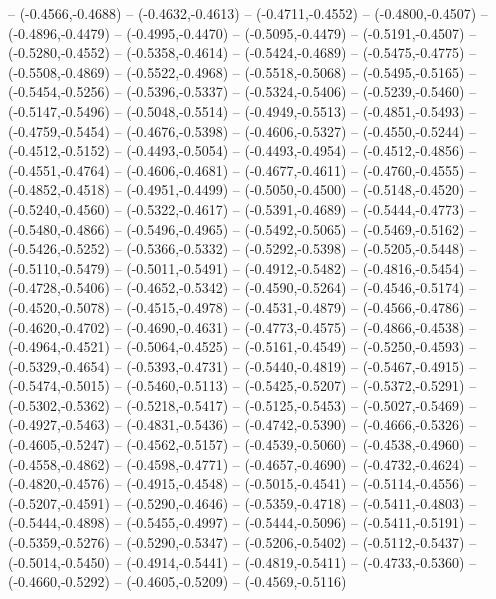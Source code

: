 {	-- (-0.4566,-0.4688)
	-- (-0.4632,-0.4613)
	-- (-0.4711,-0.4552)
	-- (-0.4800,-0.4507)
	-- (-0.4896,-0.4479)
	-- (-0.4995,-0.4470)
	-- (-0.5095,-0.4479)
	-- (-0.5191,-0.4507)
	-- (-0.5280,-0.4552)
	-- (-0.5358,-0.4614)
	-- (-0.5424,-0.4689)
	-- (-0.5475,-0.4775)
	-- (-0.5508,-0.4869)
	-- (-0.5522,-0.4968)
	-- (-0.5518,-0.5068)
	-- (-0.5495,-0.5165)
	-- (-0.5454,-0.5256)
	-- (-0.5396,-0.5337)
	-- (-0.5324,-0.5406)
	-- (-0.5239,-0.5460)
	-- (-0.5147,-0.5496)
	-- (-0.5048,-0.5514)
	-- (-0.4949,-0.5513)
	-- (-0.4851,-0.5493)
	-- (-0.4759,-0.5454)
	-- (-0.4676,-0.5398)
	-- (-0.4606,-0.5327)
	-- (-0.4550,-0.5244)
	-- (-0.4512,-0.5152)
	-- (-0.4493,-0.5054)
	-- (-0.4493,-0.4954)
	-- (-0.4512,-0.4856)
	-- (-0.4551,-0.4764)
	-- (-0.4606,-0.4681)
	-- (-0.4677,-0.4611)
	-- (-0.4760,-0.4555)
	-- (-0.4852,-0.4518)
	-- (-0.4951,-0.4499)
	-- (-0.5050,-0.4500)
	-- (-0.5148,-0.4520)
	-- (-0.5240,-0.4560)
	-- (-0.5322,-0.4617)
	-- (-0.5391,-0.4689)
	-- (-0.5444,-0.4773)
	-- (-0.5480,-0.4866)
	-- (-0.5496,-0.4965)
	-- (-0.5492,-0.5065)
	-- (-0.5469,-0.5162)
	-- (-0.5426,-0.5252)
	-- (-0.5366,-0.5332)
	-- (-0.5292,-0.5398)
	-- (-0.5205,-0.5448)
	-- (-0.5110,-0.5479)
	-- (-0.5011,-0.5491)
	-- (-0.4912,-0.5482)
	-- (-0.4816,-0.5454)
	-- (-0.4728,-0.5406)
	-- (-0.4652,-0.5342)
	-- (-0.4590,-0.5264)
	-- (-0.4546,-0.5174)
	-- (-0.4520,-0.5078)
	-- (-0.4515,-0.4978)
	-- (-0.4531,-0.4879)
	-- (-0.4566,-0.4786)
	-- (-0.4620,-0.4702)
	-- (-0.4690,-0.4631)
	-- (-0.4773,-0.4575)
	-- (-0.4866,-0.4538)
	-- (-0.4964,-0.4521)
	-- (-0.5064,-0.4525)
	-- (-0.5161,-0.4549)
	-- (-0.5250,-0.4593)
	-- (-0.5329,-0.4654)
	-- (-0.5393,-0.4731)
	-- (-0.5440,-0.4819)
	-- (-0.5467,-0.4915)
	-- (-0.5474,-0.5015)
	-- (-0.5460,-0.5113)
	-- (-0.5425,-0.5207)
	-- (-0.5372,-0.5291)
	-- (-0.5302,-0.5362)
	-- (-0.5218,-0.5417)
	-- (-0.5125,-0.5453)
	-- (-0.5027,-0.5469)
	-- (-0.4927,-0.5463)
	-- (-0.4831,-0.5436)
	-- (-0.4742,-0.5390)
	-- (-0.4666,-0.5326)
	-- (-0.4605,-0.5247)
	-- (-0.4562,-0.5157)
	-- (-0.4539,-0.5060)
	-- (-0.4538,-0.4960)
	-- (-0.4558,-0.4862)
	-- (-0.4598,-0.4771)
	-- (-0.4657,-0.4690)
	-- (-0.4732,-0.4624)
	-- (-0.4820,-0.4576)
	-- (-0.4915,-0.4548)
	-- (-0.5015,-0.4541)
	-- (-0.5114,-0.4556)
	-- (-0.5207,-0.4591)
	-- (-0.5290,-0.4646)
	-- (-0.5359,-0.4718)
	-- (-0.5411,-0.4803)
	-- (-0.5444,-0.4898)
	-- (-0.5455,-0.4997)
	-- (-0.5444,-0.5096)
	-- (-0.5411,-0.5191)
	-- (-0.5359,-0.5276)
	-- (-0.5290,-0.5347)
	-- (-0.5206,-0.5402)
	-- (-0.5112,-0.5437)
	-- (-0.5014,-0.5450)
	-- (-0.4914,-0.5441)
	-- (-0.4819,-0.5411)
	-- (-0.4733,-0.5360)
	-- (-0.4660,-0.5292)
	-- (-0.4605,-0.5209)
	-- (-0.4569,-0.5116)
}
